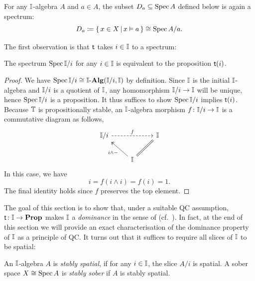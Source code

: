 \begin{example}
  For any $\mathbb{I}$-algebra $A$ and $a\in A$, the subset $D_a\subseteq \operatorname{Spec} A$ defined below is again a spectrum:
  \[ D_a \coloneq \left\{\,x \in X\,\middle|\,x \vDash a\,\right\} \cong \operatorname{Spec} A/a\text{.} \]
\end{example}

The first observation is that $\mathsf{t}$ takes $i \in \mathbb{I}$ to a spectrum:

\begin{lemma}\label{lem:openpropsober}
  The spectrum $\operatorname{Spec}\mathbb{I}/i$ for any $i \in \mathbb{I}$ is equivalent to the proposition $\mathsf{t}(i)$.
\end{lemma}
\begin{proof}
  We have $\operatorname{Spec} \mathbb{I}/i \cong \mathbb{I}\text{-}\mathbf{Alg}(\mathbb{I}/i,\mathbb{I})$ by definition. Since $\mathbb{I}$ is the initial $\mathbb{I}$-algebra and $\mathbb{I}/i$ is a quotient of $\mathbb{I}$, any homomorphism $\mathbb{I}/i \to \mathbb{I}$ will be unique, hence $\operatorname{Spec}\mathbb{I}/i$ is a proposition. It thus suffices to show $\operatorname{Spec}\mathbb{I}/i$ implies $\mathsf{t}(i)$. Because $\mathbb{T}$ is propositionally stable, an $\mathbb{I}$-algebra morphism $f \colon \mathbb{I}/i \to \mathbb{I}$ is a commutative diagram as follows,
  \[
  \begin{tikzcd}
    \mbb{I}/i \ar[rr, dashed, "f"] & & \mbb{I} \\ 
    & \mbb{I} \ar[ul, two heads, "i \wedge -"] \ar[ur, equal]
  \end{tikzcd}
  \]
  In this case, we have
  \[ i = f(i \wedge i) = f(i) = 1\text{.} \]
  The final identity holds since $f$ preserves the top element. 
\end{proof}

The goal of this section is to show that, under a suitable \gls{QC} assumption, $\mathsf{t}\colon \mathbb{I} \to \mathbf{Prop}$ makes $\mathbb{I}$ a \emph{dominance} in the sense of \citet{rosolini1986continuity} (cf.~). In fact, at the end of this section we will provide an exact characterisation of the dominance property of $\mathbb{I}$ as a principle of \gls{QC}. It turns out that it suffices to require all slices of $\mathbb{I}$ to be spatial:

\begin{definition}
  An $\mathbb{I}$-algebra $A$ is \emph{stably spatial}, if for any $i \in \mathbb{I}$, the slice $A/i$ is spatial. A sober space $X \cong \operatorname{Spec} A$ is \emph{stably sober} if $A$ is stably spatial.
\end{definition}

\PrintAxiomSQCI

